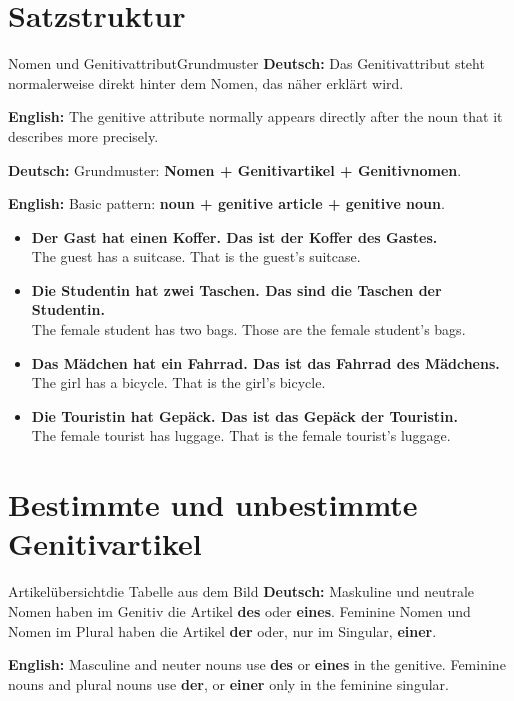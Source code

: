 \documentclass[a4paper,11pt]{article}
\newcommand{\GermanText}[1]{\textbf{Deutsch: }#1\par}
\newcommand{\EnglishText}[1]{{\small\color{SoftGray}\textbf{English: }#1\par}}
\newcommand{\ExampleItem}[2]{\item \textbf{#1}\\{\small\color{SoftGray}#2}}
\begin{document}
    \section{Satzstruktur}

        \begin{grammarentry}{Nomen und Genitivattribut}{Grundmuster}
            \GermanText{Das Genitivattribut steht normalerweise direkt hinter dem Nomen, das näher erklärt wird.}
            \EnglishText{The genitive attribute normally appears directly after the noun that it describes more precisely.}

            \GermanText{Grundmuster: \textbf{Nomen + Genitivartikel + Genitivnomen}.}
            \EnglishText{Basic pattern: \textbf{noun + genitive article + genitive noun}.}
        \end{grammarentry}

        \begin{exbox}
            \begin{itemize}
                \ExampleItem{Der Gast hat einen Koffer. Das ist der Koffer des Gastes.}{The guest has a suitcase. That is the guest's suitcase.}
                \ExampleItem{Die Studentin hat zwei Taschen. Das sind die Taschen der Studentin.}{The female student has two bags. Those are the female student's bags.}
                \ExampleItem{Das Mädchen hat ein Fahrrad. Das ist das Fahrrad des Mädchens.}{The girl has a bicycle. That is the girl's bicycle.}
                \ExampleItem{Die Touristin hat Gepäck. Das ist das Gepäck der Touristin.}{The female tourist has luggage. That is the female tourist's luggage.}
            \end{itemize}
        \end{exbox}

    \section{Bestimmte und unbestimmte Genitivartikel}

        \begin{grammarentry}{Artikelübersicht}{die Tabelle aus dem Bild}
            \GermanText{Maskuline und neutrale Nomen haben im Genitiv die Artikel \textbf{des} oder \textbf{eines}. Feminine Nomen und Nomen im Plural haben die Artikel \textbf{der} oder, nur im Singular, \textbf{einer}.}
            \EnglishText{Masculine and neuter nouns use \textbf{des} or \textbf{eines} in the genitive. Feminine nouns and plural nouns use \textbf{der}, or \textbf{einer} only in the feminine singular.}
        \end{grammarentry}
\end{document}
